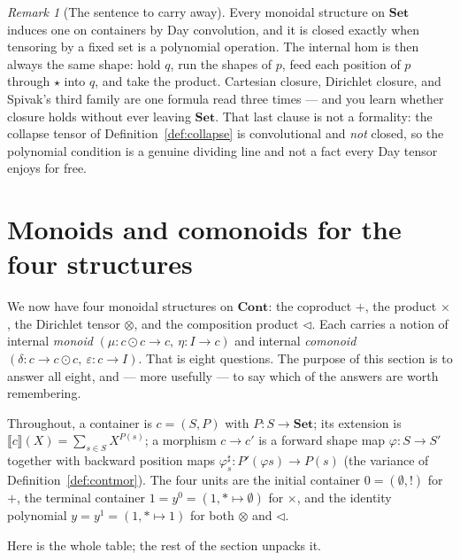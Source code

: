 \documentclass[11pt,a4paper]{book}
\newcommand{\Set}{\mathbf{Set}}
\newcommand{\Cont}{\mathbf{Cont}}
\newcommand{\Ext}[1]{\llbracket #1 \rrbracket}
\newcommand{\sh}{\sharp}
\theoremstyle{plain}
\theoremstyle{definition}
\theoremstyle{remark}
\newtheorem{Remark}[Theorem]{Remark}
\begin{document}
\begin{Remark}[The sentence to carry away]
Every monoidal structure on $\Set$ induces one on containers by Day convolution,
and it is closed exactly when tensoring by a fixed set is a polynomial operation.
The internal hom is then always the same shape: hold $q$, run the shapes of $p$,
feed each position of $p$ through $\star$ into $q$, and take the product. Cartesian
closure, Dirichlet closure, and Spivak's third family are one formula read three
times --- and you learn whether closure holds without ever leaving $\Set$. That
last clause is not a formality: the collapse tensor of
Definition~\ref{def:collapse} is convolutional and \emph{not} closed, so the
polynomial condition is a genuine dividing line and not a fact every Day tensor
enjoys for free.
\end{Remark}

\section{Monoids and comonoids for the four structures}
\label{sec:comonoid-table}

We now have four monoidal structures on $\Cont$: the coproduct $+$, the product
$\times$, the Dirichlet tensor $\otimes$, and the composition product
$\triangleleft$. Each carries a notion of internal \emph{monoid}
$(\mu\colon c\odot c\to c,\ \eta\colon I\to c)$ and internal \emph{comonoid}
$(\delta\colon c\to c\odot c,\ \varepsilon\colon c\to I)$. That is eight
questions. The purpose of this section is to answer all eight, and --- more
usefully --- to say which of the answers are worth remembering.

Throughout, a container is $c=(S,P)$ with $P\colon S\to\Set$; its extension is
$\Ext c(X)=\sum_{s\in S}X^{P(s)}$; a morphism $c\to c'$ is a forward shape map
$\varphi\colon S\to S'$ together with backward position maps
$\varphi^\sh_s\colon P'(\varphi s)\to P(s)$ (the variance of
Definition~\ref{def:contmor}). The four units are the initial container $0=(\emptyset,!)$
for $+$, the terminal container $1=y^0=(1,\ast\mapsto\emptyset)$ for $\times$, and
the identity polynomial $y=y^1=(1,\ast\mapsto 1)$ for both $\otimes$ and
$\triangleleft$.

Here is the whole table; the rest of the section unpacks it.
\end{document}
